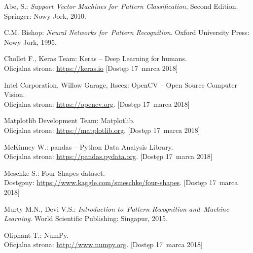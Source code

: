 \documentclass[11pt,a4paper]{article}
\begin{document}
\begin{thebibliography}{9}

        Abe, S.:
        \emph{Support Vector Machines for~Pattern Classification},
        Second Edition.
        Springer:
        Nowy Jork,
        2010.

        C.M. Bishop:
        \emph{Neural Networks for~Pattern Recognition}.
        Oxford University Press:
        Nowy Jork,
        1995.

        Chollet F., Keras Team:
        Keras -- Deep Learning for humans. \\
        Oficjalna strona: \url{https://keras.io}
        [Dostęp 17~marca 2018]

        Intel Corporation, Willow Garage, Itseez:
        OpenCV -- Open Source Computer Vision. \\
        Oficjalna strona: \url{https://opencv.org}.
        [Dostęp 17~marca 2018]

        Matplotlib Development Team:
        Matplotlib. \\
        Oficjalna strona: \url{https://matplotlib.org}.
        [Dostęp 17~marca 2018]

        McKinney W.:
        pandas -- Python Data Analysis Library. \\
        Oficjalna strona: \url{https://pandas.pydata.org}.
        [Dostęp 17~marca 2018]

        Meschke S.:
        Four Shapes dataset. \\
        Dostępny: \url{https://www.kaggle.com/smeschke/four-shapes}.
        [Dostęp 17~marca 2018]

        Murty M.N.,
        Devi V.S.:
        \emph{Introduction to~Pattern Recognition and~Machine Learning}.
        World Scientific Publishing:
        Singapur,
        2015.

        Oliphant T.:
        NumPy. \\
        Oficjalna strona: \url{http://www.numpy.org}.
        [Dostęp 17~marca 2018]

\end{thebibliography}
\end{document}
